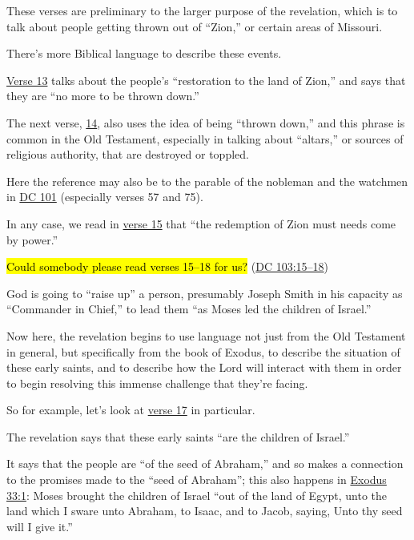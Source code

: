 \begin{compactitem}
			\item These verses are preliminary to the larger purpose of the revelation, which is to talk about people getting thrown out of ``Zion,'' or certain areas of Missouri.
				\begin{compactitem}
					\item There's more Biblical language to describe these events.
						\begin{compactitem}
							\item \item \hyperref[DC103-13]{Verse 13} talks about the people's ``restoration to the land of Zion,'' and says that they are ``no more to be thrown down.''
							\item The next verse, \hyperref[DC103-14]{14}, also uses the idea of being ``thrown down,'' and this phrase is common in the Old Testament, especially in talking about ``altars,'' or sources of religious authority, that are destroyed or toppled.
							\item Here the reference may also be to the parable of the nobleman and the watchmen in \hyperref[DC101]{DC 101} (especially verses 57 and 75).
						\end{compactitem}
					\item In any case, we read in \hyperref[DC103-15]{verse 15} that ``the redemption of Zion must needs come by power.''
					\item \hl{Could somebody please read verses 15--18 for us?} (\hyperref[DC103-15]{DC 103:15--18})
						\begin{compactitem}
							\item God is going to ``raise up'' a person, presumably Joseph Smith in his capacity as ``Commander in Chief,'' to lead them ``as Moses led the children of Israel.''
							\item Now here, the revelation begins to use language not just from the Old Testament in general, but specifically from the book of Exodus, to describe the situation of these early saints, and to describe how the Lord will interact with them in order to begin resolving this immense challenge that they're facing.
							\item So for example, let's look at \hyperref[DC103-17]{verse 17} in particular.
							\item The revelation says that these early saints ``are the children of Israel.''
							\item It says that the people are ``of the seed of Abraham,'' and so makes a connection to the promises made to the ``seed of Abraham''; this also happens in \hyperref[EXODUS-33-1]{Exodus 33:1}: Moses brought the children of Israel ``out of the land of Egypt, unto the land which I sware unto Abraham, to Isaac, and to Jacob, saying, Unto thy seed will I give it.''

\end{compactitem}
\end{compactitem}
\end{compactitem}
